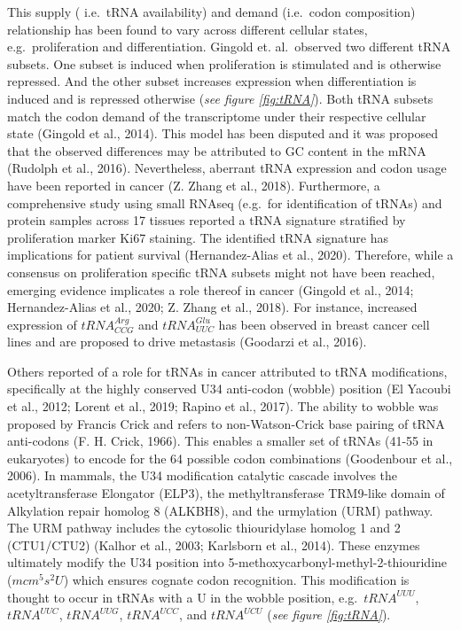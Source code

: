 \documentclass[
  12pt,
  openany]{book}
\begin{document}
This supply ( i.e.~tRNA availability) and demand (i.e.~codon composition) relationship has been found to vary across different cellular states, e.g.~proliferation and differentiation. Gingold et. al.~observed two different tRNA subsets. One subset is induced when proliferation is stimulated and is otherwise repressed. And the other subset increases expression when differentiation is induced and is repressed otherwise (\emph{see figure \ref{fig:tRNA}}). Both tRNA subsets match the codon demand of the transcriptome under their respective cellular state (Gingold et al., 2014). This model has been disputed and it was proposed that the observed differences may be attributed to GC content in the mRNA (Rudolph et al., 2016). Nevertheless, aberrant tRNA expression and codon usage have been reported in cancer (Z. Zhang et al., 2018). Furthermore, a comprehensive study using small RNAseq (e.g.~for identification of tRNAs) and protein samples across 17 tissues reported a tRNA signature stratified by proliferation marker Ki67 staining. The identified tRNA signature has implications for patient survival (Hernandez-Alias et al., 2020). Therefore, while a consensus on proliferation specific tRNA subsets might not have been reached, emerging evidence implicates a role thereof in cancer (Gingold et al., 2014; Hernandez-Alias et al., 2020; Z. Zhang et al., 2018). For instance, increased expression of \(tRNA_{CCG}^{Arg}\) and \(tRNA_{UUC}^{Glu}\) has been observed in breast cancer cell lines and are proposed to drive metastasis (Goodarzi et al., 2016).

Others reported of a role for tRNAs in cancer attributed to tRNA modifications, specifically at the highly conserved U34 anti-codon (wobble) position (El Yacoubi et al., 2012; Lorent et al., 2019; Rapino et al., 2017). The ability to wobble was proposed by Francis Crick and refers to non-Watson-Crick base pairing of tRNA anti-codons (F. H. Crick, 1966). This enables a smaller set of tRNAs (41-55 in eukaryotes) to encode for the 64 possible codon combinations (Goodenbour et al., 2006). In mammals, the U34 modification catalytic cascade involves the acetyltransferase Elongator (ELP3), the methyltransferase TRM9-like domain of Alkylation repair homolog 8 (ALKBH8), and the urmylation (URM) pathway. The URM pathway includes the cytosolic thiouridylase homolog 1 and 2 (CTU1/CTU2) (Kalhor et al., 2003; Karlsborn et al., 2014). These enzymes ultimately modify the U34 position into 5-methoxycarbonyl-methyl-2-thiouridine (\(mcm^5s^2U\)) which ensures cognate codon recognition. This modification is thought to occur in tRNAs with a U in the wobble position, e.g.~\(tRNA^{UUU}\), \(tRNA^{UUC}\), \(tRNA^{UUG}\), \(tRNA^{UCC}\), and \(tRNA^{UCU}\) (\emph{see figure \ref{fig:tRNA}}).
\end{document}
